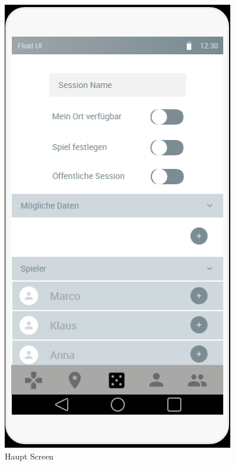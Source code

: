 \begin{figure}[H]
  \begin{minipage}[b]{0.4\textwidth}
    \includegraphics[width=\textwidth]{images/newSession.PNG}
    \caption{Haupt Screen}
    \label{fig:newSession}
  \end{minipage}

\end{figure}
